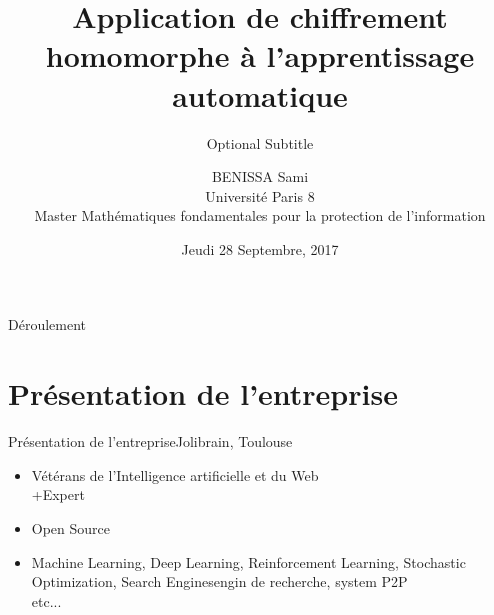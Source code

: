 \documentclass{beamer}
\title{Application de chiffrement homomorphe à l'apprentissage automatique}
\subtitle{Optional Subtitle}
\author{BENISSA Sami \\
      Université Paris 8\\
    Master Mathématiques fondamentales pour la protection de l'information}
\institute[Jolibrain, Toulouse, France] %
\date{Jeudi 28 Septembre, 2017}
\begin{document}
\begin{frame}
  \titlepage
\end{frame}

\begin{frame}{Déroulement}
  \tableofcontents
 
\end{frame}

\section{Présentation de l'entreprise}


\begin{frame}{Présentation de l'entreprise}{Jolibrain, Toulouse}
\begin{itemize}
  \item {
    Vétérans de l'Intelligence artificielle et du Web\\
    +Expert
    \pause 
  }
  \item {   
    Open Source
    \pause
  }
    \item {   
      Machine Learning, Deep Learning, Reinforcement Learning, Stochastic Optimization, Search Enginesengin de recherche, system P2P \\
      etc...
    \pause
    }
\end{itemize}
\end{frame}

  
\end{document}
